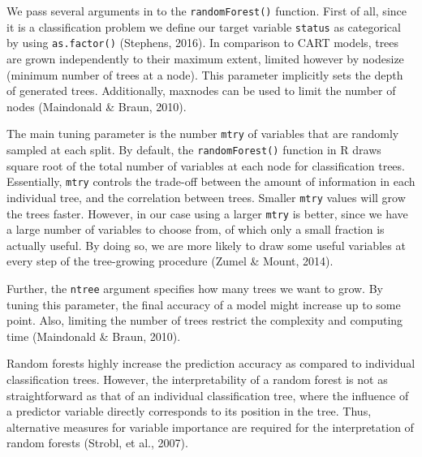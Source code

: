 \documentclass{article}
\begin{document}


We pass several arguments in to the \texttt{randomForest()} function. First of all, since it is a classification problem we define our target variable \texttt{status} as categorical by using \texttt{as.factor()} (Stephens, 2016). In comparison to CART models, trees are grown independently to their maximum extent, limited however by nodesize (minimum number of trees at a node). This parameter implicitly sets the depth of generated trees. Additionally, maxnodes can be used to limit the number of nodes (Maindonald \& Braun, 2010). 

The main tuning parameter is the number \texttt{mtry} of variables that are randomly sampled at each split. By default, the \texttt{randomForest()} function in R draws square root of the total number of variables at each node for classification trees. Essentially, \texttt{mtry} controls the trade-off between the amount of information in each individual tree, and the correlation between trees. Smaller \texttt{mtry} values will grow the trees faster. However, in our case using a larger \texttt{mtry} is better, since we have a large number of variables to choose from, of which only a small fraction is actually useful. By doing so, we are more likely to draw some useful variables at every step of the tree-growing procedure (Zumel \& Mount, 2014).

Further, the \texttt{ntree} argument specifies how many trees we want to grow. By tuning this parameter, the final accuracy of a model might increase up to some point. Also, limiting the number of trees restrict the complexity and computing time (Maindonald \& Braun, 2010). 

Random forests highly increase the prediction accuracy as compared to individual classification trees. However, the interpretability of a random forest is not as straightforward as that of an individual classification tree, where the influence of a predictor variable directly corresponds to its position in the tree. Thus, alternative measures for variable importance are required for the interpretation of random forests (Strobl, et al., 2007). 
\end{document}
